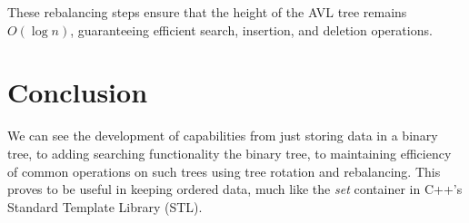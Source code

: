 \documentclass{article}
\begin{document}
These rebalancing steps ensure that the height of the AVL tree remains $O(\log n)$, guaranteeing efficient search, insertion, and deletion operations.

\section{Conclusion}
\label{conclusion}

We can see the development of capabilities from just storing data in a binary tree, to adding searching functionality the binary tree, to maintaining efficiency of common operations on such trees using tree rotation and rebalancing. This proves to be useful in keeping ordered data, much like the \emph{set} container in C++'s Standard Template Library (STL).
\end{document}
